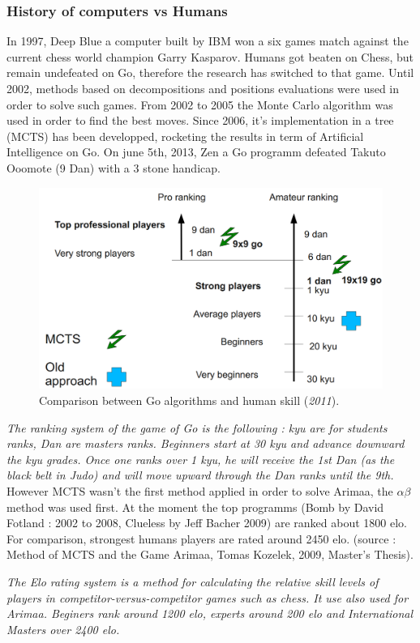 

\subsubsection{History of computers vs Humans}
In 1997, Deep Blue a computer built by IBM won a six games match against the current chess world champion Garry Kasparov. Humans got beaten on Chess, but remain undefeated on Go, therefore the research has switched to that game. Until 2002, methods based on decompositions and positions evaluations were used in order to solve such games. From 2002 to 2005 the Monte Carlo algorithm was used in order to find the best moves. Since 2006, it's implementation in a tree (MCTS) has been developped, rocketing the results in term of Artificial Intelligence on Go. On june 5th, 2013, Zen a Go programm defeated Takuto Ooomote (9 Dan) with a 3 stone handicap.
\begin{figure}[H]
\centering
\includegraphics[width=12cm]{2_State_of_the_art/Arimaa_on_MCTS_Benoit/img/ranking.png}
\caption{\label{fig:ranking}Comparison between Go algorithms and human skill (\textit{2011}).}
\end{figure}
\textit{The ranking system of the game of Go is the following : kyu are for students ranks, Dan are masters ranks. Beginners start at 30 kyu and advance downward the kyu grades. Once one ranks over 1 kyu, he will receive the 1st Dan (as the black belt in Judo) and will move upward through the Dan ranks until the 9th.}\\
However MCTS wasn't the first method applied in order to solve Arimaa, the \ensuremath{\alpha\beta} method was used first. At the moment the top programms (Bomb by David Fotland : 2002 to 2008, Clueless by Jeff Bacher 2009) are ranked about 1800 elo. For comparison, strongest humans players are rated around 2450 elo. (source : Method of MCTS and the Game Arimaa, Tomas Kozelek, 2009, Master's Thesis).
\medskip

\textit{The Elo rating system is a method for calculating the relative skill levels of players in competitor-versus-competitor games such as chess. It use also used for Arimaa. Beginers rank around 1200 elo, experts around 200 elo and International Masters over 2400 elo.}

